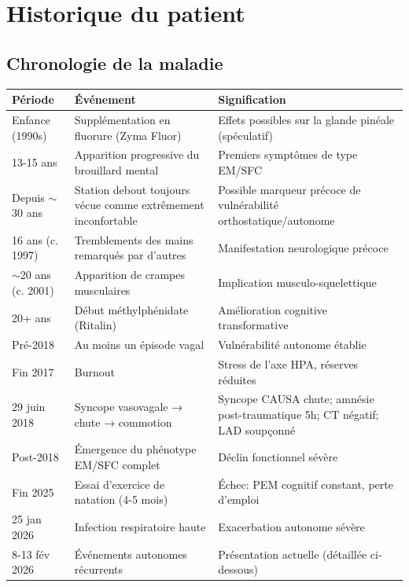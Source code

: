 
\section{Historique du patient}

\subsection{Chronologie de la maladie}

\begin{longtable}{p{3cm}p{6cm}p{5cm}}
\toprule
\textbf{Période} & \textbf{Événement} & \textbf{Signification} \\
\midrule
Enfance (1990s) & Supplémentation en fluorure (Zyma Fluor) & Effets possibles sur la glande pinéale (spéculatif) \\
\midrule
13-15 ans & Apparition progressive du brouillard mental & Premiers symptômes de type EM/SFC \\
\midrule
Depuis $\sim$30 ans & Station debout toujours vécue comme extrêmement inconfortable & Possible marqueur précoce de vulnérabilité orthostatique/autonome \\
\midrule
16 ans (c. 1997) & Tremblements des mains remarqués par d'autres & Manifestation neurologique précoce \\
\midrule
$\sim$20 ans (c. 2001) & Apparition de crampes musculaires & Implication musculo-squelettique \\
\midrule
20+ ans & Début méthylphénidate (Ritalin) & Amélioration cognitive transformative \\
\midrule
Pré-2018 & Au moins un épisode vagal & Vulnérabilité autonome établie \\
\midrule
Fin 2017 & Burnout & Stress de l'axe HPA, réserves réduites \\
\midrule
29 juin 2018 & Syncope vasovagale → chute → commotion & Syncope CAUSA chute; amnésie post-traumatique 5h; CT négatif; LAD soupçonné \\
\midrule
Post-2018 & Émergence du phénotype EM/SFC complet & Déclin fonctionnel sévère \\
\midrule
Fin 2025 & Essai d'exercice de natation (4-5 mois) & Échec: PEM cognitif constant, perte d'emploi \\
\midrule
25 jan 2026 & Infection respiratoire haute & Exacerbation autonome sévère \\
\midrule
8-13 fév 2026 & Événements autonomes récurrents & Présentation actuelle (détaillée ci-dessous) \\
\bottomrule
\end{longtable}

